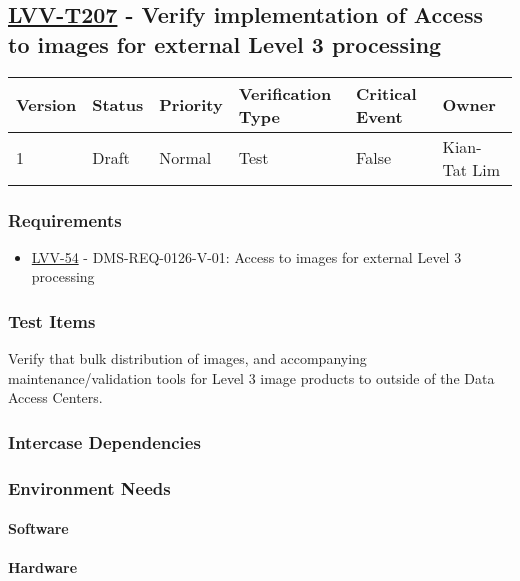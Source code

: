 \subsection{\href{https://jira.lsstcorp.org/secure/Tests.jspa\#/testCase/LVV-T207}{LVV-T207}
    - Verify implementation of Access to images for external Level 3 processing}\label{lvv-t207}

\begin{longtable}[]{llllll}
\toprule
Version & Status & Priority & Verification Type & Critical Event & Owner
\\\midrule
1 & Draft & Normal &
Test & False & Kian-Tat Lim
\\\bottomrule
\end{longtable}

\subsubsection{Requirements}
\begin{itemize}
\item \href{https://jira.lsstcorp.org/browse/LVV-54}{LVV-54} - DMS-REQ-0126-V-01: Access to images for external Level 3 processing
\end{itemize}

\subsubsection{Test Items}
Verify that bulk distribution of images, and accompanying
maintenance/validation tools for Level 3 image products to outside of
the Data Access Centers.



\subsubsection{Intercase Dependencies}

\subsubsection{Environment Needs}

\paragraph{Software}

\paragraph{Hardware}

